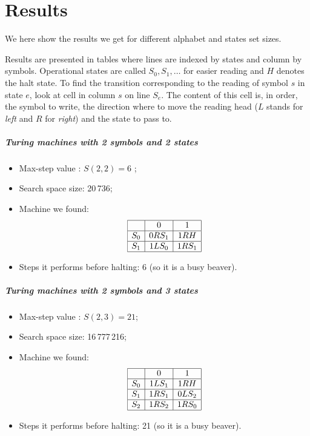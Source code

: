 \documentclass{report}
\begin{document}
\chapter{Results}
\label{chap:results}

We here show the results we get for different alphabet and states set sizes.

Results are presented in tables where lines are indexed by states and column by symbols. Operational states are called $S_0, S_1, \dots$ for easier reading and $H$ denotes the halt state. To find the transition corresponding to the reading of symbol $s$ in state $e$, look at cell in column $s$ on line $S_e$. The content of this cell is, in order, the symbol to write, the direction where to move the reading head ($L$ stands for \emph{left} and $R$ for \emph{right}) and the state to pass to.

\paragraph{Turing machines with 2 symbols and 2 states}

\begin{itemize}
\item Max-step value \cite{rado}: $S(2,2) = 6$ ;
\item Search space size: 20\,736;
\item Machine we found:
\[
\begin{array}[h]{|c|c|c|}
\hline
   &0     &1\\
\hline
S_0& 0RS_1& 1RH\\
\hline
S_1& 1LS_0& 1RS_1\\
\hline
\end{array}
\]
\item Steps it performs before halting: 6 (so it is a busy beaver).
\end{itemize}

\paragraph{Turing machines with 2 symbols and 3 states}

\begin{itemize}
\item Max-step value \cite{lin}: $S(2,3) = 21$;
\item Search space size: 16\,777\,216;
\item Machine we found:
\[
\begin{array}[h]{|c|c|c|c|}
\hline
   & 0    &1\\
\hline
S_0& 1LS_1& 1RH\\
\hline
S_1& 1RS_1& 0LS_2\\
\hline
S_2& 1RS_2& 1RS_0\\
\hline
\end{array}
\]
\item Steps it performs before halting: 21 (so it is a busy beaver).
\end{itemize}
\end{document}

